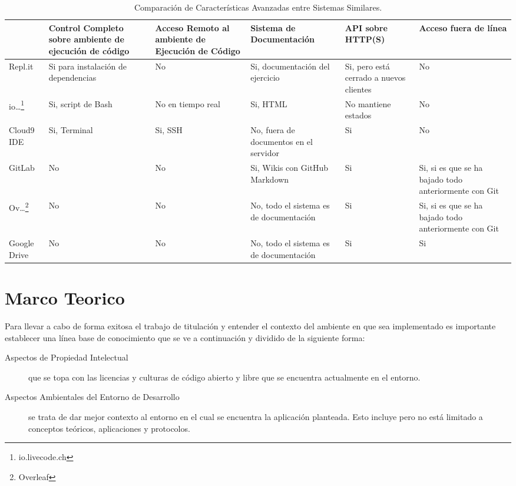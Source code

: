 \begin{table}[h!]
    \begin{tabular}{|p{}|p{}|p{}|p{}|p{}|p{}|}
        \hline
            & Control Completo sobre \mbox{ambiente} de ejecución de código & Acceso \mbox{Remoto} al ambiente de Ejecución de Código & Sistema de Documentación & API sobre HTTP(S) & Acceso fuera de línea \\
        \hline
        Repl.it & Si para \mbox{instalación} de \mbox{dependencias} & No & Si, \mbox{documentación} del ejercicio & Si, \mbox{pero} \mbox{está} \mbox{cerrado} a nuevos clientes & No \\
        \hline
        io\ldots\footnote{io.livecode.ch} & Si, script de Bash & No en \mbox{tiempo} real & Si, HTML & No \mbox{mantiene} estados & No \\
        \hline
        Cloud9 IDE & Si, Terminal & Si, SSH & No, fuera de \mbox{documentos} en el servidor & Si & No \\
        \hline
        GitLab & No & No & Si, Wikis con GitHub Markdown & Si & Si, si es que se ha bajado todo anteriormente con Git \\
        \hline
        Ov\ldots\footnote{Overleaf} & No & No & No, todo el sistema es de \mbox{documentación} & Si & Si, si es que se ha bajado todo anteriormente con Git \\
        \hline
        Google Drive & No & No & No, todo el sistema es de \mbox{documentación} & Si & Si \\
        \hline
    \end{tabular}
	\caption{Comparación de Características Avanzadas entre \mbox{Sistemas} Similares.}
    \label{comparacion-sistemas-similares-3}
\end{table}

\section{Marco Teorico}
Para llevar a cabo de forma exitosa el trabajo de titulación y entender el contexto del ambiente en que sea implementado es importante establecer una línea base de conocimiento que se ve a continuación y dividido de la siguiente forma:
\begin{description}
	\item[Aspectos de Propiedad Intelectual] que se topa con las licencias y culturas de código abierto y libre que se encuentra actualmente en el entorno.
    \item[Aspectos Ambientales del Entorno de Desarrollo] se trata de dar mejor contexto al entorno en el cual se encuentra la aplicación planteada. Esto incluye pero no está limitado a conceptos teóricos, aplicaciones y protocolos.
\end{description}

